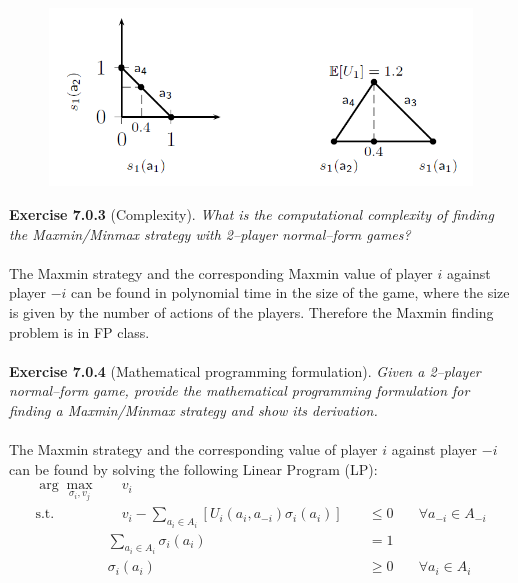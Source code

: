 \begin{figure}[H]
\centering
\includegraphics[scale=0.6]{images/img_2_7_02.png}
\end{figure}
\noindent
\textbf{Exercise 7.0.3} (Complexity). \textit{What is the computational complexity of finding the Maxmin/Minmax strategy with 2–player normal–form games?}\\\\
The Maxmin strategy and the corresponding Maxmin value of player $i$ against player $-i$ can be found in polynomial time in the size of the game, where the size is given by the number of actions of the players. Therefore the Maxmin finding problem is in FP class.\\\\
\textbf{Exercise 7.0.4} (Mathematical programming formulation). \textit{Given a 2–player normal–form game, provide the mathematical programming formulation for finding a Maxmin/Minmax strategy and show its derivation.}\\\\
The Maxmin strategy and the corresponding value of player $ i $
against player $ -i $ can be found by solving the following Linear Program (LP):
$$
\begin{aligned}
\arg \max_{\sigma_{i}, v_j} & \quad v_{i} \\
\text{s.t.} & \quad v_{i}-\sum_{a_{i} \in A_{i}}\left[U_{i}\left(a_{i}, a_{-i}\right) \sigma_{i}\left(a_{i}\right)\right] & \quad \leqslant 0 & \quad \forall a_{-i} \in A_{-i} \\
& \sum_{a_{i} \in A_{i}} \sigma_{i}\left(a_{i}\right) & \quad =1 &\\
& \sigma_{i}\left(a_{i}\right) & \quad \geqslant  0 & \quad \forall a_{i} \in A_{i}
\end{aligned}
$$
